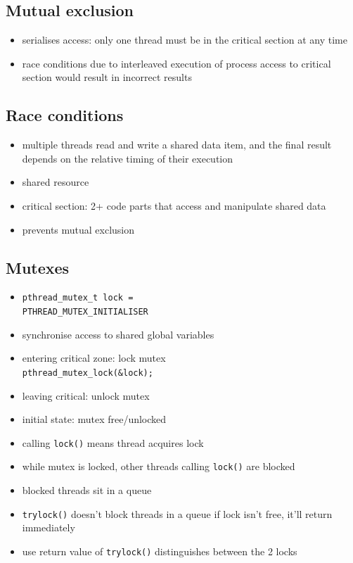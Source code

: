 \documentclass[10pt, multicolumn, a4paper]{article}
\begin{document}
\begin{multicols}{2}
	\subsection*{Mutual exclusion}
	\begin{itemize}
	\item serialises access: only one thread must be in the critical section at any time
	\item race conditions due to interleaved execution of process access to critical section would result in incorrect results
	\end{itemize}
	\subsection*{Race conditions}
	\begin{itemize}
	\item multiple threads read and write a shared data item, and the final result depends on the relative timing of their execution
	\item shared resource
	\item critical section: 2+ code parts that access and manipulate shared data
	\item prevents mutual exclusion
	\end{itemize}
	\subsection*{Mutexes}
	\begin{itemize}
	\item \verb|pthread_mutex_t lock =| \\ \verb|PTHREAD_MUTEX_INITIALISER|
	\item synchronise access to shared global variables
	\item entering critical zone: lock mutex \\ \verb|pthread_mutex_lock(&lock);|
	\item leaving critical: unlock mutex
	\item initial state: mutex free/unlocked
	\item calling \verb|lock()| means thread acquires lock 
	\item while mutex is locked, other threads calling \verb|lock()| are blocked
	\item blocked threads sit in a queue
	\item \verb|trylock()| doesn't block threads in a queue if lock isn't free, it'll return immediately
	\item use return value of \verb|trylock()| distinguishes between the 2 locks
	\end{itemize}

\end{multicols}
\end{document}
